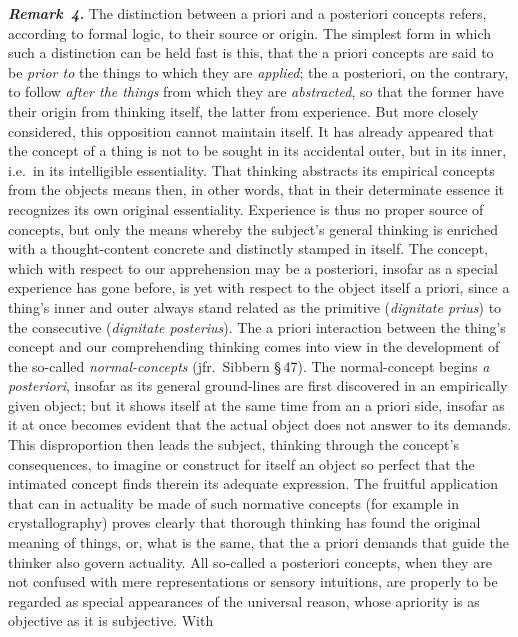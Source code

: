 \documentclass[12pt]{book}
\newcommand{\anm}[1]{\emph{\textbf{Remark~#1.}}}
\begin{document}
\anm{4} The distinction between a priori and a posteriori concepts refers,
according to formal logic, to their source or origin. The simplest form in
which such a distinction can be held fast is this, that the a priori
concepts are said to be \emph{prior to} the things to which they are
\emph{applied}; the a posteriori, on the contrary, to follow \emph{after the
things} from which they are \emph{abstracted}, so that the former have their
origin from thinking itself, the latter from experience. But more closely
considered, this opposition cannot maintain itself. It has already appeared
that the concept of a thing is not to be sought in its accidental outer, but
in its inner, i.e.\ in its intelligible essentiality. That thinking
abstracts its empirical concepts from the objects means then, in other
words, that in their determinate essence it recognizes its own original
essentiality. Experience is thus no proper source of concepts, but only the
means whereby the subject's general thinking is enriched with a
thought-content concrete and distinctly stamped in itself. The concept,
which with respect to our apprehension may be a posteriori, insofar as a
special experience has gone before, is yet with respect to the object itself
a priori, since a thing's inner and outer always stand related as the
primitive (\textit{dignitate prius}) to the consecutive (\textit{dignitate
posterius}). The a priori interaction between the thing's concept and our
comprehending thinking comes into view in the development of the so-called
\emph{normal-concepts} (jfr.\ Sibbern \S\,47). The normal-concept begins
\textit{a posteriori}, insofar as its general ground-lines are first
discovered in an empirically given object; but it shows itself at the same
time from an a priori side, insofar as it at once becomes evident that the
actual object does not answer to its demands. This disproportion then leads
the subject, thinking through the concept's consequences, to imagine or
construct for itself an object so perfect that the intimated concept finds
therein its adequate expression. The fruitful application that can in
actuality be made of such normative concepts (for example in
crystallography) proves clearly that thorough thinking has found the
original meaning of things, or, what is the same, that the a priori demands
that guide the thinker also govern actuality. All so-called a posteriori
concepts, when they are not confused with mere representations or sensory
intuitions, are properly to be regarded as special appearances of the
universal reason, whose apriority is as objective as it is subjective. With
\end{document}

